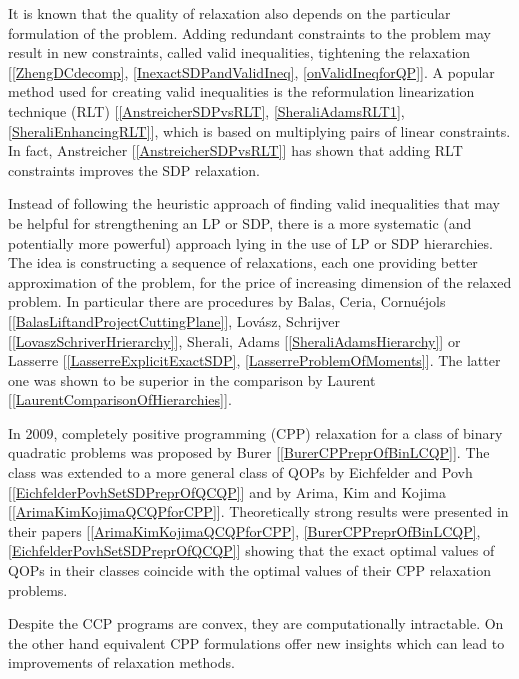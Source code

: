 \documentclass[12pt]{book}
\theoremstyle{definition}
\begin{document}
It is known that the quality of relaxation also depends on the particular formulation of the problem. Adding redundant constraints to the problem may result in new constraints, called valid inequalities, tightening the relaxation [\ref{ZhengDCdecomp}, \ref{InexactSDPandValidIneq}, \ref{onValidIneqforQP}]. A popular method used for creating valid inequalities is the reformulation linearization technique (RLT) [\ref{AnstreicherSDPvsRLT}, \ref{SheraliAdamsRLT1}, \ref{SheraliEnhancingRLT}], which is based on multiplying pairs of linear constraints. In fact, Anstreicher [\ref{AnstreicherSDPvsRLT}] has shown that adding RLT constraints improves the SDP relaxation.

Instead of following the heuristic approach of finding valid inequalities that may be helpful
for strengthening an LP or SDP, there is a more systematic (and potentially more powerful) approach
lying in the use of LP or SDP hierarchies. The idea is constructing a sequence of relaxations, each one providing better approximation of the problem, for the price of increasing dimension of the relaxed problem.
In particular there are procedures
by Balas, Ceria, Cornuéjols [\ref{BalasLiftandProjectCuttingPlane}], Lovász, Schrijver [\ref{LovaszSchriverHrierarchy}],  Sherali, Adams [\ref{SheraliAdamsHierarchy}] or Lasserre [\ref{LasserreExplicitExactSDP}, \ref{LasserreProblemOfMoments}]. The latter one was shown to be superior in the comparison by Laurent [\ref{LaurentComparisonOfHierarchies}].



In 	2009, completely positive programming (CPP) relaxation for a class of binary quadratic problems was proposed
by Burer [\ref{BurerCPPreprOfBinLCQP}]. 
The class was extended to a more general class of QOPs by Eichfelder and
Povh [\ref{EichfelderPovhSetSDPreprOfQCQP}] and by Arima, Kim and Kojima [\ref{ArimaKimKojimaQCQPforCPP}]. Theoretically strong results were presented in
their papers [\ref{ArimaKimKojimaQCQPforCPP}, \ref{BurerCPPreprOfBinLCQP}, \ref{EichfelderPovhSetSDPreprOfQCQP}] showing that the exact optimal values of QOPs in their classes coincide
with the optimal values of their CPP relaxation problems.

Despite the CCP programs are convex, they are computationally intractable. On the other hand equivalent CPP formulations offer new insights which can lead to improvements of relaxation methods. 
\end{document}
